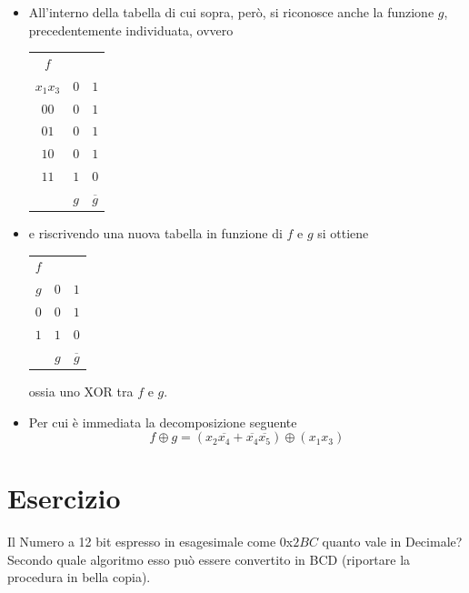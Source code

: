 \documentclass[a4paper]{extarticle}
\renewcommand\arraystretch{}
\begin{document}
\begin{itemize}
    \item All'interno della tabella di cui sopra, però, si riconosce anche la funzione $g$, precedentemente individuata, ovvero
    
    \noindent
    \begin{table}[H]
    \setlength{\tabcolsep}{4pt}
    \renewcommand{\arraystretch}{1}
    \centering
    \begin{tabular}{|c|c|c|}
        $f$ & &\\
        $x_1x_3$ & $0$ & $1$\\
        \hline 
        $00$ & $0$ & $1$\\
        $01$ & $0$ & $1$\\
        $10$ & $0$ & $1$\\
        $11$ & $1$ & $0$\\
        \hline
        &$g$ & $\overline{g}$\\
    \end{tabular}
    \end{table}

    \item e riscrivendo una nuova tabella in funzione di $f$ e $g$ si ottiene
    
    \noindent
    \begin{table}[H]
    \setlength{\tabcolsep}{4pt}
    \renewcommand{\arraystretch}{1}
    \centering
    \begin{tabular}{|c|c|c|}
        $f$ & &\\
        $g$ & $0$ & $1$\\
        \hline 
        $0$ & $0$ & $1$\\
        $1$ & $1$ & $0$\\
        \hline
        &$g$ & $\overline{g}$\\
    \end{tabular}
    \end{table}

    \noindent
    ossia uno XOR tra $f$ e $g$.

    \item Per cui è immediata la decomposizione seguente
    \[f \oplus g = (x_2\overline{x_4} + \overline{x_4}\overline{x_5}) \oplus (x_1 x_3)\]
\end{itemize}

\noindent
\section{Esercizio}
Il Numero a 12 bit espresso in esagesimale come $0$x$2BC$ quanto vale in Decimale? Secondo quale algoritmo esso può essere convertito in BCD (riportare la procedura in bella copia).
\end{document}
